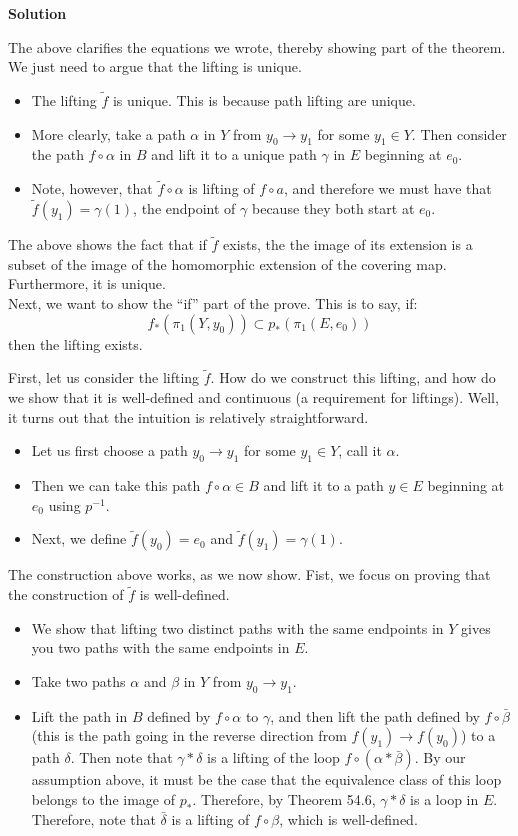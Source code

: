 \documentclass[12pt]{article}
\newcounter{AnswerCounter}
\newcounter{SubAnswerCounter}
\newenvironment{answer}[0]{
  \setcounter{SubAnswerCounter}{1}
  \bigskip
  \textbf{Solution \arabic{AnswerCounter}}
  \\
  \begin{small}
}{
  \end{small}
  \stepcounter{AnswerCounter}
}
\begin{document}
\begin{answer}
The above clarifies the equations we wrote, thereby showing part of the theorem. We just need to argue that the lifting is unique.
\begin{itemize}
\item The lifting $\tilde{f}$ is unique. This is because path lifting are unique.
\item More clearly, take a path $\alpha$ in $Y$ from $y_0 \to y_1$ for some $y_1 \in Y$. Then consider the path $f \circ \alpha $ in $B$ and lift it to a unique path $\gamma$ in $E$ beginning at $e_0$.
\item Note, however, that $\tilde{f} \circ \alpha$ is lifting of $f \circ a$, and therefore we must have that $\tilde{f}(y_1) = \gamma(1)$, the endpoint of $\gamma$ because they both start at $e_0$.
\end{itemize}
The above shows the fact that if $\tilde{f}$ exists, the the image of its extension is a subset of the image of the homomorphic extension of the covering map. Furthermore, it is unique. \\

Next, we want to show the ``if'' part of the prove. This is to say, if:
$$
f_*(\pi_1(Y,y_0)) \subset p_*(\pi_1(E,e_0))
$$
then the lifting exists.

First, let us consider the lifting $\tilde{f}$. How do we construct this lifting, and how do we show that it is well-defined and continuous (a requirement for liftings). Well, it turns out that the intuition is relatively straightforward.
\begin{itemize}
\item Let us first choose a path $y_0 \to y_1$ for some $y_1 \in Y$, call it $\alpha.$
\item Then we can take this path $f \circ \alpha \in B$ and lift it to a path $y \in E$ beginning at $e_0$ using $p^{-1}$.
\item Next, we define $\tilde{f}(y_0) = e_0$ and $\tilde{f}(y_1) = \gamma(1)$.
\end{itemize}
The construction above works, as we now show. Fist, we focus on proving that the construction of $\tilde{f}$ is well-defined.
\begin{itemize}
\item We show that lifting two distinct paths with the same endpoints in $Y$ gives you two paths with the same endpoints in $E$.
\item Take two paths $\alpha$ and $\beta$ in $Y$ from $y_0 \to y_1$.
\item Lift the path in $B$ defined by $f \circ \alpha$ to $\gamma$, and then lift the path defined by $f \circ \bar{\beta}$ (this is the path going in the reverse direction from $f(y_1) \to f(y_0)$) to a path $\delta$. Then note that $\gamma * \delta$ is a lifting of the loop $f \circ (\alpha * \bar{\beta})$. By our assumption above, it must be the case that the equivalence class of this loop belongs to the image of $p_*$. Therefore, by Theorem 54.6, $\gamma * \delta$ is a loop in $E$. Therefore, note that $\bar{\delta}$ is a lifting of $f \circ \beta$, which is well-defined. \\
\end{itemize}


\end{answer}
\end{document}

